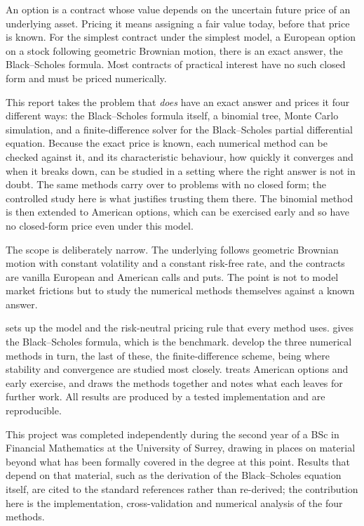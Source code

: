 \documentclass[11pt,a4paper]{article}
\numberwithin{equation}{section}
\theoremstyle{definition}
\theoremstyle{plain}
\theoremstyle{remark}
\begin{document}
An option is a contract whose value depends on the uncertain future price of an
underlying asset. Pricing it means assigning a fair value today, before that
price is known. For the simplest contract under the simplest model, a European
option on a stock following geometric Brownian motion, there is an exact answer,
the Black--Scholes formula. Most contracts of practical interest have no such
closed form and must be priced numerically.

This report takes the problem that \emph{does} have an exact answer and prices it
four different ways: the Black--Scholes formula itself, a binomial tree, Monte
Carlo simulation, and a finite-difference solver for the Black--Scholes partial
differential equation. Because the exact price is known, each numerical method
can be checked against it, and its characteristic behaviour, how quickly it
converges and when it breaks down, can be studied in a setting where the right
answer is not in doubt. The same methods carry over to problems with no closed
form; the controlled study here is what justifies trusting them there. The
binomial method is then extended to American options, which can be exercised
early and so have no closed-form price even under this model.

The scope is deliberately narrow. The underlying follows geometric Brownian
motion with constant volatility and a constant risk-free rate, and the contracts
are vanilla European and American calls and puts. The point is not to model
market frictions but to study the numerical methods themselves against a known
answer.

 sets up the model and the risk-neutral pricing rule that every
method uses.  gives the Black--Scholes formula, which is the
benchmark.  develop the three numerical
methods in turn, the last of these, the finite-difference scheme, being where
stability and convergence are studied most closely.  treats
American options and early exercise, and  draws the methods
together and notes what each leaves for further work. All results are produced by
a tested implementation and are reproducible.

This project was completed independently during the second year of a BSc in
Financial Mathematics at the University of Surrey, drawing in places on
material beyond what has been formally covered in the degree at this point.
Results that depend on that material, such as the derivation of the
Black--Scholes equation itself, are cited to the standard references rather
than re-derived; the contribution here is the implementation, cross-validation
and numerical analysis of the four methods.
\clearpage
\end{document}
